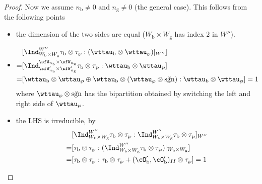\documentclass[12pt]{amsart}
\newcommand{\sgn}{\operatorname{sgn}}
\numberwithin{equation}{section}
\theoremstyle{remark}
\def\brsgn{\breve{\sgn}}
\def\nbb{n_{\mathrm b}}
\def\ngg{n_{\mathrm g}}
\def\cOpb{\cO'_{\mathrm b}}
\begin{document}
{\begin{proof}
{    Now we assume $\nbb\neq 0$ and $\ngg\neq 0$ (the general case). This
    follows from the following points
    \begin{itemize}
      \item the dimension of the two sides are equal ($W_{\mathrm b}\times W_{\mathrm g}$ has
            index $2$ in $W''$).
      \item
            \[
            \begin{split}
              &[\Ind_{W_{\mathrm b}\times W_{\mathrm g}}^{W''}\tau_{\mathrm b}\otimes \tau_{\wp}:(\wttau_{\mathrm b}\otimes \wttau_{\wp})|_{W''}] \\
              =& [\Ind_{\sfW'_{n_{\mathrm b}}\times \sfW'_{n_{\mathrm g}}}^{\sfW_{n_{\mathrm b}}\times \sfW_{n_{\mathrm g}}}\tau_{\mathrm b}\otimes \tau_{\wp}:\wttau_{\mathrm b}\otimes \wttau_{\wp}]\\
              =& [\wttau_{\mathrm b}\otimes \wttau_{\wp} \oplus \wttau_{\mathrm b}\otimes (\wttau_{\wp}\otimes \brsgn):\wttau_{\mathrm b}\otimes \wttau_{\wp}] =1\\
            \end{split}
            \]
            where $\wttau_{\wp}\otimes \brsgn$ has the bipartition obtained by
            switching the left and right side of $\wttau_{\wp}$.
      \item the LHS is irreducible, by
            \[
            \begin{split}
              & [\Ind_{W_{\mathrm b}\times W_{\mathrm g}}^{W''}\tau_{\mathrm b}\otimes \tau_{\wp}:
              \Ind_{W_{\mathrm b}\times W_{\mathrm g}}^{W''}\tau_{\mathrm b}\otimes \tau_{\wp}]_{W''}\\
              =&  [\tau_{\mathrm b}\otimes \tau_{\wp} : (\Ind_{W_{\mathrm b}\times W_{\mathrm g}}^{W''}\tau_{\mathrm b}\otimes \tau_{\wp})|_{W_{\mathrm b}\times W_{\mathrm g}}]\\
              =& [\tau_{\mathrm b}\otimes \tau_{\wp} : \tau_{\mathrm b}\otimes \tau_{\wp} + (\cOpb,\cOpb)_{II} \otimes \tau_{\wp} ] = 1
            \end{split}
            \]
    \end{itemize}
  }


\end{proof}}
\end{document}

